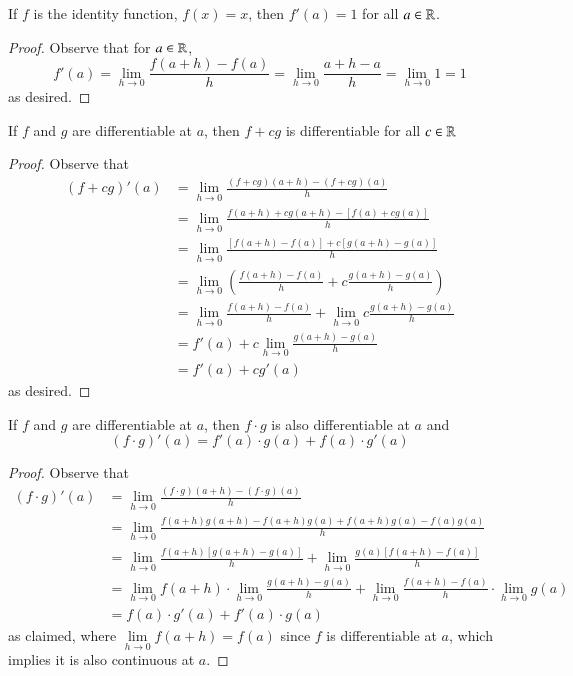 \documentclass[12pt, a4paper, oneside, openright, titlepage]{book}
\begin{document}
\begin{thm}
    If $f$ is the identity function, $f(x) = x$, then $f'(a) = 1$ for all $a \in \mathbb R$.
\end{thm}
\begin{proof}
    Observe that for $a \in \mathbb R$, $$f'(a) = \lim\limits_{h\rightarrow 0}\frac{f(a+h)-f(a)}{h} = \lim\limits_{h\rightarrow 0}\frac{a+h-a}{h} = \lim\limits_{h\rightarrow 0} 1 = 1$$
    as desired.
\end{proof}

\begin{thm}[Linearity]
    If $f$ and $g$ are differentiable at $a$, then $f+cg$ is differentiable for all $c \in \mathbb R$
\end{thm}
\begin{proof}
    Observe that \begin{align*}
        (f+cg)'(a) &= \lim\limits_{h\rightarrow 0}\frac{(f+cg)(a+h) - (f+cg)(a)}{h} \\
        &= \lim\limits_{h\rightarrow 0}\frac{f(a+h)+cg(a+h)-[f(a)+cg(a)]}{h} \\
        &= \lim\limits_{h\rightarrow 0}\frac{[f(a+h)-f(a)]+c[g(a+h)-g(a)]}{h} \\
        &= \lim\limits_{h\rightarrow 0}\left(\frac{f(a+h)-f(a)}{h}+c\frac{g(a+h)-g(a)}{h}\right) \\
        &= \lim\limits_{h\rightarrow 0}\frac{f(a+h)-f(a)}{h}+\lim\limits_{h\rightarrow 0}c\frac{g(a+h)-g(a)}{h} \\
        &= f'(a) + c\lim\limits_{h\rightarrow 0}\frac{g(a+h)-g(a)}{h} \\
        &= f'(a)+cg'(a) 
    \end{align*}
    as desired.
\end{proof}

\begin{thm}
    If $f$ and $g$ are differentiable at $a$, then $f\cdot g$ is also differentiable at $a$ and $$(f\cdot g)'(a) = f'(a)\cdot g(a) + f(a) \cdot g'(a)$$
\end{thm}
\begin{proof}
    Observe that \begin{align*}
        (f\cdot g)'(a) &= \lim\limits_{h\rightarrow 0}\frac{(f\cdot g)(a+h) - (f\cdot g)(a)}{h} \\
        &= \lim\limits_{h\rightarrow 0}\frac{f(a+h)g(a+h) - f(a+h)g(a) + f(a+h)g(a) - f(a)g(a)}{h} \\
        &= \lim\limits_{h\rightarrow 0}\frac{f(a+h)[g(a+h)-g(a)]}{h} + \lim\limits_{h\rightarrow 0}\frac{g(a)[f(a+h) - f(a)]}{h} \\
        &= \lim\limits_{h\rightarrow 0}f(a+h)\cdot \lim\limits_{h\rightarrow 0}\frac{g(a+h) - g(a)}{h} + \lim\limits_{h\rightarrow 0}\frac{f(a+h)-f(a)}{h}\cdot \lim\limits_{h\rightarrow 0}g(a) \\
        &= f(a)\cdot g'(a) + f'(a)\cdot g(a)
    \end{align*}
    as claimed, where $\lim\limits_{h\rightarrow 0}f(a+h) = f(a)$ since $f$ is differentiable at $a$, which implies it is also continuous at $a$.
\end{proof}
\end{document}
